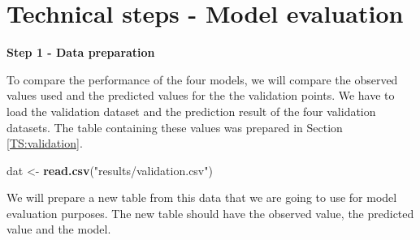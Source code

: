 \documentclass[10pt,b5paper,]{book}
\newenvironment{Shaded}{\begin{snugshade}}{\end{snugshade}}
\newcommand{\CommentTok}[1]{\textcolor[rgb]{0.56,0.35,0.01}{\textit{#1}}}
\newcommand{\DataTypeTok}[1]{\textcolor[rgb]{0.13,0.29,0.53}{#1}}
\newcommand{\KeywordTok}[1]{\textcolor[rgb]{0.13,0.29,0.53}{\textbf{#1}}}
\newcommand{\NormalTok}[1]{#1}
\newcommand{\OperatorTok}[1]{\textcolor[rgb]{0.81,0.36,0.00}{\textbf{#1}}}
\newcommand{\StringTok}[1]{\textcolor[rgb]{0.31,0.60,0.02}{#1}}
\theoremstyle{definition}
\theoremstyle{definition}
\theoremstyle{definition}
\theoremstyle{remark}
\begin{document}
\hypertarget{technical-steps---model-evaluation}{%
\section{Technical steps - Model
evaluation}\label{technical-steps---model-evaluation}}

\textbf{Step 1 - Data preparation}

To compare the performance of the four models, we will compare the
observed values used and the predicted values for the the validation
points. We have to load the validation dataset and the prediction result
of the four validation datasets. The table containing these values was
prepared in Section \ref{TS:validation}.

\begin{Shaded}
\begin{Highlighting}[]
\NormalTok{dat <-}\StringTok{ }\KeywordTok{read.csv}\NormalTok{(}\StringTok{"results/validation.csv"}\NormalTok{)}
\end{Highlighting}
\end{Shaded}

We will prepare a new table from this data that we are going to use for
model evaluation purposes. The new table should have the observed value,
the predicted value and the model.

\begin{Shaded}
\end{Shaded}
\end{document}
